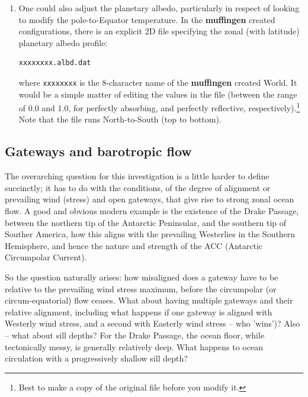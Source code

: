 \documentclass[11pt,fleqn]{book} %
\begin{document}
\begin{enumerate}
\begin{enumerate}
\item One could also adjust the planetary albedo, particularly in respect of looking to modify the pole-to-Equator temperature. In the \textbf{muffingen} created configurations, there is an explicit 2D file specifying the zonal (with latitude) planetary albedo profile:
\vspace{-2pt}\begin{verbatim}
xxxxxxxx.albd.dat
\end{verbatim}\vspace{-2pt}
where \texttt{xxxxxxxx} is the 8-character name of the \textbf{muffingen} created World. It would be a simple matter of editing the values in the file (between the range of 0.0 and 1.0, for  perfectly absorbing, and perfectly reflective, respectively).\footnote{Best to make a copy of the original file before you modify it.} Note that the file runs North-to-South (top to bottom).
\end{enumerate}
\end{enumerate}
\vspace{2mm}


\subsection{Gateways and barotropic flow}

The overarching question for this investigation is a little harder to define succinctly; it has to do with the conditions, of the degree of alignment or prevailing wind (stress)
and open gateways, that give rise to strong zonal ocean flow. A good and obvious modern example is the existence of the Drake Passage, between the northern tip of the Antarctic Peninsular, and the southern tip of Souther America, how this aligns with the prevailing Westerlies in the Southern Hemisphere, and hence the nature and strength of the ACC (Antarctic Circumpolar Current).

So the question naturally arises: how misaligned does a gateway have to be relative to the prevailing wind stress maximum, before the circumpolar (or circum-equatorial) flow ceases. What about having multiple gateways and their relative alignment, including what happens if one gateway is aligned with Westerly wind stress, and a second with Easterly wind stress -- who 'wins')? Also -- what about sill depths? For the Drake Passage, the ocean floor, while tectonically messy, is generally relatively deep. What happens to ocean circulation with a progressively shallow sill depth?
\end{document}
